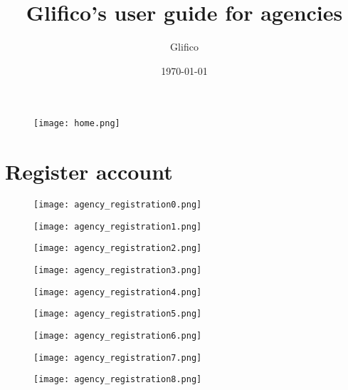 \documentclass[11 pt, a4paper]{article}
\author{Glifico}
\date{\today}
\title{Glifico's user guide for agencies}
\begin{document}
\maketitle
\begin{figure}[htb!]
\centering
\texttt{[image: home.png]}
\end{figure}

\newpage
\thispagestyle{empty}
\tableofcontents

\clearpage
\section{Register account}

\begin{figure}[H]
\centering
\texttt{[image: agency\_registration0.png]}
\end{figure}


\begin{figure}[H]
\centering
\texttt{[image: agency\_registration1.png]}
\end{figure}


\clearpage
\begin{figure}[H]
\centering
\texttt{[image: agency\_registration2.png]}
\end{figure}


\begin{figure}[H]
\centering
\texttt{[image: agency\_registration3.png]}
\end{figure}


\clearpage
\begin{figure}[H]
\centering
\texttt{[image: agency\_registration4.png]}
\end{figure}


\begin{figure}[H]
\centering
\texttt{[image: agency\_registration5.png]}
\end{figure}


\clearpage
\begin{figure}[H]
\centering
\texttt{[image: agency\_registration6.png]}
\end{figure}


\begin{figure}[H]
\centering
\texttt{[image: agency\_registration7.png]}
\end{figure}


\clearpage
\begin{figure}[H]
\centering
\texttt{[image: agency\_registration8.png]}
\end{figure}
\end{document}
